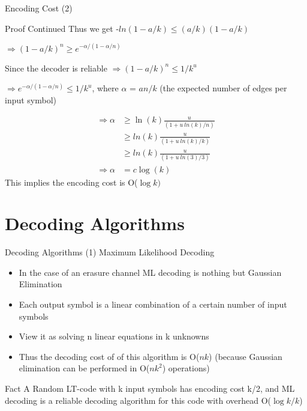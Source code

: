 \documentclass[handout,11pt]{beamer}
\begin{document}
\begin{frame}{Encoding Cost (2)}
\begin{block}{Proof Continued}
Thus we get -$ln\left (1-a/k \right)\le(a/k)(1-a/k)$

$\Rightarrow (1-a/k)^n\ge e^{-\alpha/(1-\alpha/n)}$

Since the decoder is reliable
\pause
$\Rightarrow (1-a/k)^n \le 1/k^u$

$\Rightarrow e^{-\alpha/(1-\alpha/n)}\le 1/k^u$, where $\alpha$ = $an/k$
(the expected number of edges per input symbol)

\begin{align*}

\Rightarrow \alpha & \ge\ln\left(k\right)\frac{u}{(1+u\ ln\left(k\right)/n)}\\
 & \ge ln\left(k\right)\frac{u}{(1+u\ ln\left(k\right)/k)}\\
 & \ge ln\left(k\right)\frac{u}{(1+u\ ln\left(3\right)/3)}\\
\Rightarrow \alpha & = c \log\left(k\right)
\end{align*}
This implies the encoding cost is O($\log k)$
\end{block}
\end{frame}

\section{Decoding Algorithms}
\begin{frame}{Decoding Algorithms (1)}
Maximum Likelihood Decoding
\begin{itemize}
\item In the case of an erasure channel ML decoding is nothing but Gaussian Elimination
\pause

\item Each output symbol is a linear combination of a certain number of input symbols
\pause

\item View it as solving n linear equations in k unknowns

\item Thus the decoding cost of of this algorithm is O($nk$) (because Gaussian elimination can be performed in O($nk^2$) operations)
\end{itemize}
\pause

\begin{block}{Fact}
A Random LT-code with k input symbols has encoding cost k/2, and ML decoding is a reliable decoding algorithm for this code with overhead O($\log{k}/k$)
\end{block}
\end{frame}
\end{document}
